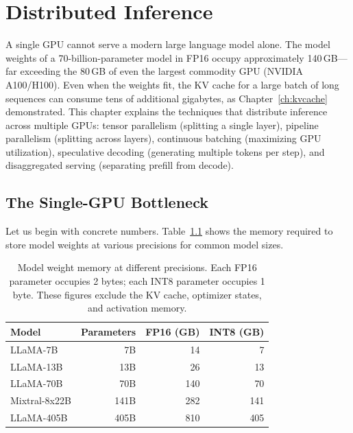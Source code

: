 \chapter{Distributed Inference}
\label{ch:distributed}

A single GPU cannot serve a modern large language model alone. The model weights of a 70-billion-parameter model in FP16 occupy approximately 140\,GB---far exceeding the 80\,GB of even the largest commodity GPU (NVIDIA A100/H100). Even when the weights fit, the KV cache for a large batch of long sequences can consume tens of additional gigabytes, as Chapter~\ref{ch:kvcache} demonstrated. This chapter explains the techniques that distribute inference across multiple GPUs: tensor parallelism (splitting a single layer), pipeline parallelism (splitting across layers), continuous batching (maximizing GPU utilization), speculative decoding (generating multiple tokens per step), and disaggregated serving (separating prefill from decode).

\section{The Single-GPU Bottleneck}
\label{sec:distributed:bottleneck}

%
Let us begin with concrete numbers. Table~\ref{tab:model-sizes} shows the memory required to store model weights at various precisions for common model sizes.

\begin{table}[h]
\centering
\begin{tabular}{lrrr}
\toprule
\textbf{Model} & \textbf{Parameters} & \textbf{FP16 (GB)} & \textbf{INT8 (GB)} \\
\midrule
LLaMA-7B   & 7B   & 14  & 7 \\
LLaMA-13B  & 13B  & 26  & 13 \\
LLaMA-70B  & 70B  & 140 & 70 \\
Mixtral-8x22B & 141B & 282 & 141 \\
LLaMA-405B & 405B & 810 & 405 \\
\bottomrule
\end{tabular}
\caption{Model weight memory at different precisions. Each FP16 parameter occupies 2 bytes; each INT8 parameter occupies 1 byte. These figures exclude the KV cache, optimizer states, and activation memory.}
\label{tab:model-sizes}
\end{table}

